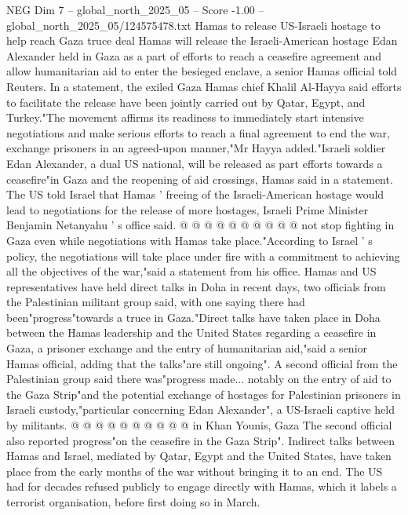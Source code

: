 \begin{textsample}{NEG Dim 7 – global\_north\_2025\_05 – Score -1.00 – global\_north\_2025\_05/124575478.txt}  \label{ex:f7_neg_129}
Hamas to release US-Israeli hostage to help reach Gaza truce deal Hamas will release the Israeli-American hostage Edan Alexander held in Gaza as a part of efforts to reach a ceasefire agreement and allow humanitarian aid to enter the besieged enclave, a senior Hamas official told Reuters.
In a statement, the exiled Gaza Hamas chief Khalil Al-Hayya said efforts to facilitate the release have been jointly carried out by Qatar, Egypt, and Turkey."The movement affirms its readiness to immediately start intensive negotiations and make serious efforts to reach a final agreement to end the war, exchange prisoners in an agreed-upon manner,"Mr Hayya added."Israeli soldier Edan Alexander, a dual US national, will be released as part efforts towards a ceasefire"in Gaza and the reopening of aid crossings, Hamas said in a statement.
The US told Israel that Hamas ' freeing of the Israeli-American hostage would lead to negotiations for the release of more hostages, Israeli Prime Minister Benjamin Netanyahu ' s office said. @ @ @ @ @ @ @ @ @ @ not stop fighting in Gaza even while negotiations with Hamas take place."According to Israel ' s policy, the negotiations will take place under fire with a commitment to achieving all the objectives of the war,"said a statement from his office.
Hamas and US representatives have held direct talks in Doha in recent days, two officials from the Palestinian militant group said, with one saying there had been"progress"towards a truce in Gaza."Direct talks have taken place in Doha between the Hamas leadership and the United States regarding a ceasefire in Gaza, a prisoner exchange and the entry of humanitarian aid,"said a senior Hamas official, adding that the talks"are still ongoing".
A second official from the Palestinian group said there was"progress made... notably on the entry of aid to the Gaza Strip"and the potential exchange of hostages for Palestinian prisoners in Israeli custody,"particular concerning Edan Alexander", a US-Israeli captive held by militants. @ @ @ @ @ @ @ @ @ @ in Khan Younis, Gaza The second official also reported progress"on the ceasefire in the Gaza Strip".
Indirect talks between Hamas and Israel, mediated by Qatar, Egypt and the United States, have taken place from the early months of the war without bringing it to an end.
The US had for decades refused publicly to engage directly with Hamas, which it labels a terrorist organisation, before first doing so in March.

\end{textsample}
